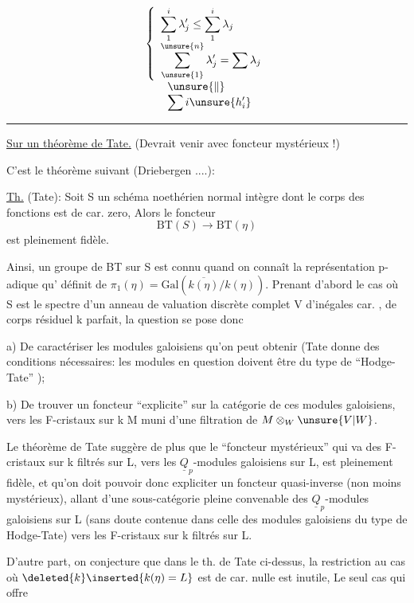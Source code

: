 \[
\begin{array}{l}
\left\{\begin{array}{l}
\displaystyle\sum_1^i\lambda'_j\leq\displaystyle\sum_1^i\lambda_j\\
\displaystyle\sum_{\unsure{1}}^{\unsure{n}}\lambda'_j=\displaystyle\sum\lambda_j
\end{array}\right.\\
\qquad\unsure{\Vert}\\
\qquad\displaystyle\sum i\unsure{h'_i}
\end{array}
\]
\hrule

\uline{Sur un théorème de Tate.} (Devrait venir avec foncteur mystérieux !)

C'est le théorème suivant (Driebergen ....):

\uline{Th.} (Tate): Soit S un schéma noethérien normal intègre dont le corps des fonctions  est de car. zero, Alors le foncteur
\[
\mathrm{BT}(S)\longrightarrow\mathrm{BT}(\eta)
\]
est pleinement fidèle.

Ainsi, un groupe de BT sur S est connu  quand on connaît la représentation p-adique qu' définit de $\pi_1(\eta)=\mathrm{Gal}(\overline{k(\eta)}/k(\eta))$. Prenant d'abord le cas où S est le spectre d'un anneau de valuation discrète complet V d'inégales car. , de corps  résiduel k parfait, la question se pose donc

a) De caractériser les modules galoisiens qu'on peut obtenir (Tate donne des conditions nécessaires: les modules en question doivent être du type de ``Hodge-Tate'' );

b) De trouver un foncteur ``explicite'' sur la catégorie de ces modules galoisiens, vers les F-cristaux sur k M muni d'une filtration de $M\otimes_W\unsure{V|W}$.

Le théorème de Tate suggère de plus que le ``foncteur mystérieux'' qui va des F-cristaux sur k filtrés sur L, vers les $\underline{Q}_p$-modules galoisiens sur L, est pleinement fidèle, et qu'on doit pouvoir donc  expliciter un foncteur quasi-inverse (non moins mystérieux), allant d'une sous-catégorie pleine convenable des $\underline{Q}_p$-modules galoisiens sur L (sans doute contenue dans celle des modules galoisiens du type de Hodge-Tate) vers les F-cristaux sur k filtrés sur L.

D'autre part, on conjecture que dans le th. de Tate ci-dessus, la restriction au cas où $\deleted{k}\inserted{k(\eta)=L}$ est de car. nulle est inutile, Le seul cas qui offre


